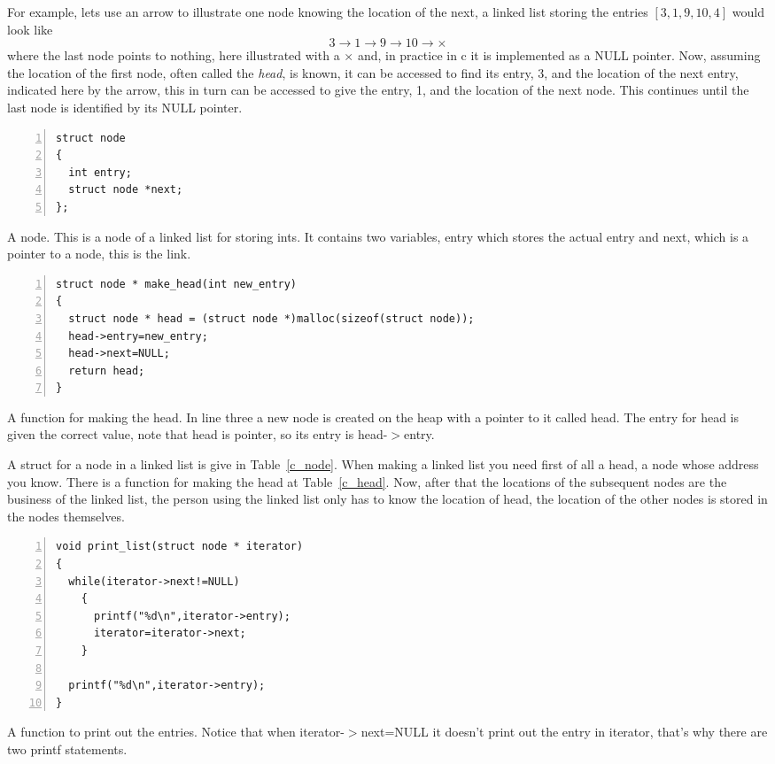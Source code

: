\documentclass[11pt,a4paper]{scrartcl}
\begin{document}
For example, lets use an arrow to illustrate one node knowing the
location of the next, a linked list storing the entries $[3,1,9,10,4]$
would look like
\begin{equation}
3\rightarrow 1\rightarrow 9\rightarrow 10\rightarrow \times
\end{equation}
where the last node points to nothing, here illustrated with a
$\times$ and, in practice in c it is implemented as a NULL pointer. Now,
assuming the location of the first node, often called the {\sl head},
is known, it can be accessed to find its entry, 3, and the location of
the next entry, indicated here by the arrow, this in turn can be
accessed to give the entry, 1, and the location of the next node. This
continues until the last node is identified by its NULL pointer. 

\begin{table}
\begin{lstlisting}[numbers=left]
struct node
{
  int entry;
  struct node *next;
};
\end{lstlisting}
\caption{A node. This is a node of a linked list for storing ints. It
  contains two variables, entry which stores the actual entry and
  next, which is a pointer to a node, this is the link. \label{c_node}}
\end{table}

\begin{table}
\begin{lstlisting}[numbers=left]
struct node * make_head(int new_entry)
{
  struct node * head = (struct node *)malloc(sizeof(struct node));
  head->entry=new_entry;
  head->next=NULL;
  return head;
}
\end{lstlisting}
\caption{A function for making the head. In line three a new node is
  created on the heap with a pointer to it called head. The entry for
  head is given the correct value, note that head is pointer, so its
  entry is head-$>$entry. \label{c_head}}
\end{table}


A struct for a node in a linked list is give in
Table~\ref{c_node}. When making a linked list you need first of all a
head, a node whose address you know. There is a function for making
the head at Table~\ref{c_head}. Now, after that the locations of the
subsequent nodes are the business of the linked list, the person using
the linked list only has to know the location of head, the location of
the other nodes is stored in the nodes themselves. 


\begin{table}
\begin{lstlisting}[numbers=left]
void print_list(struct node * iterator)
{
  while(iterator->next!=NULL)
    {
      printf("%d\n",iterator->entry);
      iterator=iterator->next;
    }

  printf("%d\n",iterator->entry);
}
\end{lstlisting}
\caption{A function to print out the entries. Notice that when
  iterator-$>$next=NULL it doesn't print out the entry in iterator,
  that's why there are two printf statements.\label{c_print}}
\end{table}
\end{document}
